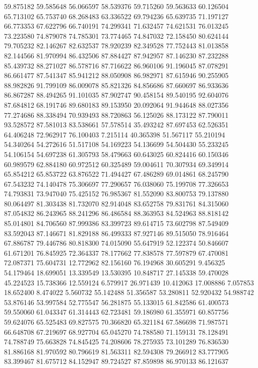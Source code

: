 59.875182
59.585648
56.066597
58.539376
59.715260
59.563633
60.126504
65.713102
65.753740
68.268483
63.336522
69.794236
65.639735
71.197127
66.773353
67.622796
66.740191
74.299341
71.632457
74.621531
76.013245
73.223580
74.879078
74.785301
73.774465
74.847032
72.158450
80.624144
79.705232
82.146267
82.632537
78.920239
82.349528
77.752443
81.013858
82.144566
81.970994
86.432506
87.884427
87.942957
87.146230
87.232288
85.439732
88.271027
86.578716
87.716622
86.960106
91.196045
87.078291
86.661477
87.541347
85.941212
88.050908
86.982971
87.615946
90.255905
88.982826
91.799109
86.009078
85.821326
84.856686
87.660697
86.933636
86.867287
88.494265
91.101035
87.902747
90.458154
89.540195
92.604076
87.684812
68.191746
89.680183
89.153950
20.092064
91.944648
88.027356
77.274686
88.338494
70.939493
88.720863
56.125026
88.173122
87.790011
93.528572
87.581013
83.538661
57.578514
35.493242
87.697453
62.526351
64.406248
72.962917
76.100403
7.215114
40.365398
51.567117
55.210194
54.340264
54.272616
51.517108
54.169223
54.136699
54.504430
55.233245
54.106154
54.697238
61.305793
58.479663
60.643025
60.824416
60.150346
60.989579
62.884180
60.972512
60.325489
59.004611
70.307934
69.349914
65.854212
65.853722
63.876522
71.494427
67.486289
69.014861
68.245790
67.543232
74.140478
75.306697
77.290657
76.038060
75.199708
77.326653
74.793831
73.947040
75.425152
76.985367
81.552090
83.800753
79.137880
80.064497
81.303438
81.732070
82.914048
83.652758
79.831761
84.315060
87.054832
86.243965
88.241296
86.486584
88.363953
84.524963
88.818142
85.014801
84.706560
87.999386
83.399723
89.614715
73.602798
87.549409
83.592043
87.146671
81.829188
86.499333
87.927146
89.515050
78.916464
67.886787
79.446786
80.818300
74.015090
55.647919
52.122374
50.846607
61.671201
76.845925
72.364337
78.177662
77.838578
77.597879
67.470081
72.087371
75.604731
12.772962
82.156160
76.194968
30.605291
9.456325
54.179464
18.699051
13.339549
13.530395
10.848717
27.145338
59.470028
45.224523
15.738366
12.559124
6.579917
26.971439
10.412063
17.008886
7.057853
18.652400
8.474022
5.560732
55.142488
51.356587
53.280811
52.920432
54.988742
53.876146
53.997584
52.775547
56.281875
55.133015
61.842586
61.400573
59.550060
61.043347
61.314443
62.723481
59.186980
61.355971
60.857756
59.624076
65.525483
69.827575
70.366820
65.321184
67.586698
71.987571
66.648708
67.219697
68.927704
65.045270
74.788580
71.159131
78.128491
74.788749
75.663828
74.845425
74.208606
78.275935
73.101289
76.836530
81.886168
81.970592
80.796619
81.563311
82.594308
79.266912
83.777905
83.399467
81.675712
84.152947
89.724527
87.859898
86.970133
86.121637
